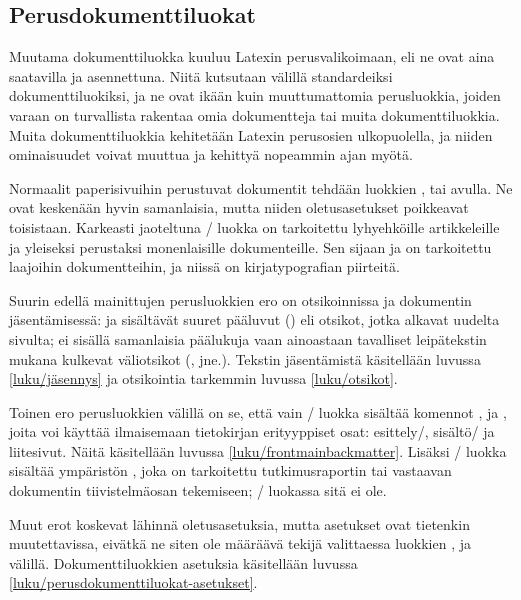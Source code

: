 
\subsection{Perusdokumenttiluokat}
\label{luku/perusdokumenttiluokat}

Muutama dokumenttiluokka kuuluu Latexin perusvalikoimaan, eli ne ovat
aina saatavilla ja asennettuna. Niitä kutsutaan välillä standardeiksi
dokumenttiluokiksi, ja ne ovat ikään kuin muuttumattomia perusluokkia,
joiden varaan on turvallista rakentaa omia dokumentteja tai muita
dokumenttiluokkia. Muita dokumenttiluokkia kehitetään Latexin perusosien
ulkopuolella, ja niiden ominaisuudet voivat muuttua ja kehittyä
nopeammin ajan myötä.

Normaalit paperisivuihin perustuvat dokumentit tehdään luokkien
,  tai  avulla. Ne ovat
keskenään hyvin samanlaisia, mutta niiden oletusasetukset poikkeavat
toisistaan. Karkeasti jaoteltuna \-/ luokka on
tarkoitettu lyhyehköille artikkeleille ja yleiseksi perustaksi
monenlaisille dokumenteille. Sen sijaan  ja 
on tarkoitettu laajoihin dokumentteihin, ja niissä on kirjatypografian
piirteitä.

Suurin edellä mainittujen perusluokkien ero on otsikoinnissa ja
dokumentin jäsentämisessä:  ja  sisältävät
suuret pääluvut () eli otsikot, jotka alkavat uudelta
sivulta;  ei sisällä samanlaisia päälukuja vaan
ainoastaan tavalliset leipätekstin mukana kulkevat väliotsikot
(,  jne.). Tekstin jäsentämistä
käsitellään luvussa \ref{luku/jäsennys} ja otsikointia tarkemmin luvussa
\ref{luku/otsikot}.

Toinen ero perusluokkien välillä on se, että vain \-/
luokka sisältää komennot ,  ja
, joita voi käyttää ilmaisemaan tietokirjan
erityyppiset osat: esittely\-/, sisältö\-/{} ja liitesivut. Näitä
käsitellään luvussa \ref{luku/frontmainbackmatter}. Lisäksi
\-/ luokka sisältää ympäristön , joka
on tarkoitettu tutkimusraportin tai vastaavan dokumentin tiivistelmäosan
tekemiseen; \-/ luokassa sitä ei ole.

Muut erot koskevat lähinnä oletusasetuksia, mutta asetukset ovat
tietenkin muutettavissa, eivätkä ne siten ole määräävä tekijä
valittaessa luokkien ,  ja 
välillä. Dokumenttiluokkien asetuksia käsitellään luvussa
\ref{luku/perusdokumenttiluokat-asetukset}.

